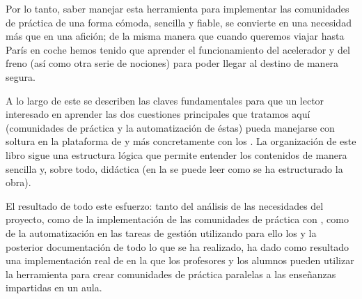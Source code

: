 Por lo tanto, saber manejar esta herramienta para implementar las comunidades de práctica de una forma cómoda, sencilla y fiable, se convierte en una necesidad más que en una afición; de la misma manera que cuando queremos viajar hasta París en coche hemos tenido que aprender el funcionamiento del acelerador y del freno (así como otra serie de nociones) para poder llegar al destino de manera segura.

A lo largo de este \pfc{} se describen las claves fundamentales para que un lector interesado en aprender las dos cuestiones principales que tratamos aquí (comunidades de práctica y la automatización de éstas) pueda manejarse con soltura en la plataforma de \tiki{} y más concretamente con los \profiles{}.
La organización de este libro sigue una estructura lógica que permite entender los contenidos de manera sencilla y, sobre todo, didáctica (en la  se puede leer como se ha estructurado la obra).

El resultado de todo este esfuerzo: tanto del análisis de las necesidades del proyecto, como de la implementación de las comunidades de práctica con \tiki{}, como de la automatización en las tareas de gestión utilizando para ello los \profiles{} y la posterior documentación de todo lo que se ha realizado, ha dado como resultado una implementación real de \alma{} en la que los profesores y los alumnos pueden utilizar la herramienta para crear comunidades de práctica paralelas a las enseñanzas impartidas en un aula.

